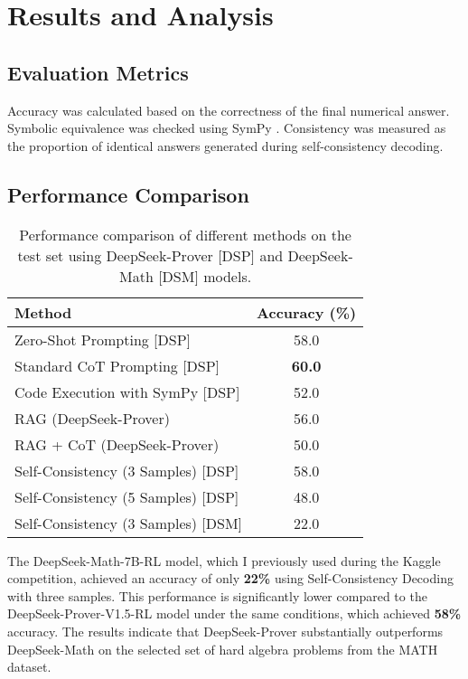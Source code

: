 \documentclass[11pt,a4paper]{article}
\begin{document}
\section{Results and Analysis}
\subsection{Evaluation Metrics}
Accuracy was calculated based on the correctness of the final numerical answer. Symbolic equivalence was checked using SymPy \cite{meurer2017sympy}. Consistency was measured as the proportion of identical answers generated during self-consistency decoding.

\subsection{Performance Comparison}
\begin{table}[H]
\centering
\footnotesize
\begin{tabular}{lc}
\toprule
\textbf{Method} & \textbf{Accuracy (\%)} \\
\midrule
Zero-Shot Prompting [DSP] & 58.0 \\
Standard CoT Prompting [DSP] & \textbf{60.0} \\
Code Execution with SymPy [DSP] & 52.0 \\
RAG (DeepSeek-Prover) & 56.0 \\
RAG + CoT (DeepSeek-Prover) & 50.0 \\
Self-Consistency (3 Samples) [DSP] & 58.0 \\
Self-Consistency (5 Samples) [DSP] & 48.0 \\
Self-Consistency (3 Samples) [DSM] & 22.0 \\
\bottomrule
\end{tabular}
\caption{Performance comparison of different methods on the test set using DeepSeek-Prover [DSP] and DeepSeek-Math [DSM] models.}
\label{tab:performance}
\end{table}

The DeepSeek-Math-7B-RL model, which I previously used during the Kaggle competition, achieved an accuracy of only \textbf{22\%} using Self-Consistency Decoding with three samples. This performance is significantly lower compared to the DeepSeek-Prover-V1.5-RL model under the same conditions, which achieved \textbf{58\%} accuracy. The results indicate that DeepSeek-Prover substantially outperforms DeepSeek-Math on the selected set of hard algebra problems from the MATH dataset.
\end{document}
